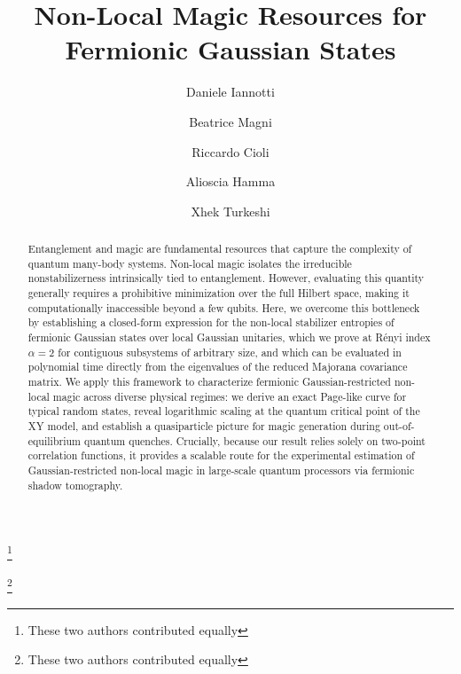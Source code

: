 \documentclass[prx,twocolumn,superscriptaddress,aps,10pt, frontmatterverbose, reprint,footinbib,longbibliography=true]{revtex4-2}
\newcommand{\RENYI}{\alpha}
\begin{document}

\title{Non-Local Magic Resources for Fermionic Gaussian States}

\author{Daniele Iannotti}
\thanks{These two authors contributed equally}



\author{Beatrice Magni}
\thanks{These two authors contributed equally}

\author{Riccardo Cioli}


\author{Alioscia Hamma}


\author{Xhek Turkeshi}


\begin{abstract}
Entanglement and magic are fundamental resources that capture the complexity of quantum many-body systems. Non-local magic isolates the irreducible nonstabilizerness intrinsically tied to entanglement. However, evaluating this quantity generally requires a prohibitive minimization over the full Hilbert space, making it computationally inaccessible beyond a few qubits. Here, we overcome this bottleneck by establishing a closed-form expression for the non-local stabilizer entropies of fermionic Gaussian states over local Gaussian unitaries, which we prove at R\'enyi index $\RENYI=2$ for contiguous subsystems of arbitrary size, and which can be evaluated in polynomial time directly from the eigenvalues of the reduced Majorana covariance matrix. We apply this framework to characterize fermionic Gaussian-restricted non-local magic across diverse physical regimes: we derive an exact Page-like curve for typical random states, reveal logarithmic scaling at the quantum critical point of the XY model, and establish a quasiparticle picture for magic generation during out-of-equilibrium quantum quenches. Crucially, because our result relies solely on two-point correlation functions, it provides a scalable route for the experimental estimation of Gaussian-restricted non-local magic in large-scale quantum processors via fermionic shadow tomography.
\end{abstract}
\end{document}
